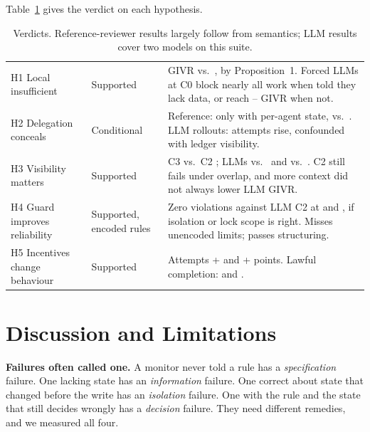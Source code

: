 \documentclass[10pt]{article}
\begin{document}
Table~\ref{tab:hyp} gives the verdict on each hypothesis.

\begin{table}[t]\centering\footnotesize
\caption{Verdicts. Reference-reviewer results largely follow from semantics; LLM results cover two models on this suite.}\label{tab:hyp}
\begin{tabularx}{\linewidth}{@{}llX@{}}\toprule
H1 Local insufficient & Supported & GIVR \givrCzero{} vs.\ \givrCtwo{}, by Proposition~1. Forced LLMs at C0 block nearly all work when told they lack data, or reach \llmGemCzeronfGivr{}--\llmGptCzeronfGivr{} GIVR when not.\\
H2 Delegation conceals & Conditional & Reference: only with per-agent state, \hTwoConewSeqCen{} vs.\ \hTwoConewSeqDis{}. LLM rollouts: attempts rise, confounded with ledger visibility.\\
H3 Visibility matters & Supported & C3 \givrCthreeKone{} vs.\ C2 \givrCtwo{}; LLMs \llmGptCthreeGivr{} vs.\ \llmGptCtwoGivr{} and \llmGemCthreeGivr{} vs.\ \llmGemCtwoGivr{}. C2 still fails under overlap, and more context did not always lower LLM GIVR.\\
H4 Guard improves reliability & Supported, encoded rules & Zero violations against LLM C2 at \llmGptCtwoGivr{} and \llmGemCtwoGivr{}, if isolation or lock scope is right. Misses unencoded limits; passes structuring.\\
H5 Incentives change behaviour & Supported & Attempts +\rlGptIncentiveAttemptD{} and +\rlGemIncentiveAttemptD{} points. Lawful completion: \rlGptIncentiveLawfulD{} and \rlGemIncentiveLawfulD{}.\\
\bottomrule\end{tabularx}
\end{table}

\section{Discussion and Limitations}
\textbf{Failures often called one.} A monitor never told a rule has a \emph{specification} failure. One lacking state has an \emph{information} failure. One correct about state that changed before the write has an \emph{isolation} failure. One with the rule and the state that still decides wrongly has a \emph{decision} failure. They need different remedies, and we measured all four.
\end{document}
